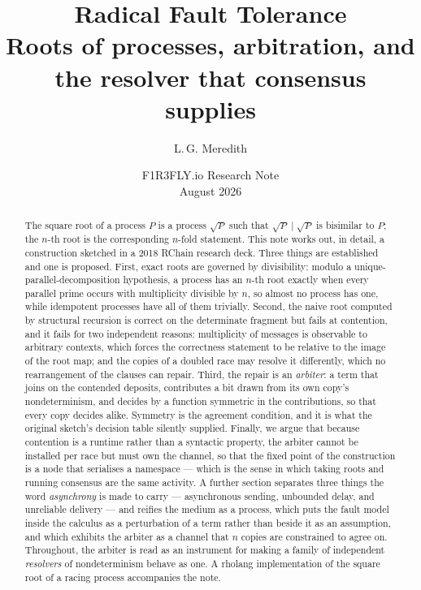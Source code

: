 \documentclass[11pt]{article}
\title{Radical Fault Tolerance\\[0.4em]
\large Roots of processes, arbitration, and the resolver that consensus supplies}
\author{L.\,G. Meredith}
\date{F1R3FLY.io Research Note\\ August 2026}
\theoremstyle{definition}
\newcommand{\rt}[1]{\sqrt{#1}}
\begin{document}
\maketitle

\begin{abstract}
The square root of a process $P$ is a process $\rt{P}$ such that $\rt{P} \mid \rt{P}$ is bisimilar to $P$; the $n$-th root is the corresponding $n$-fold statement. This note works out, in detail, a construction sketched in a 2018 RChain research deck. Three things are established and one is proposed. First, exact roots are governed by divisibility: modulo a unique-parallel-decomposition hypothesis, a process has an $n$-th root exactly when every parallel prime occurs with multiplicity divisible by $n$, so almost no process has one, while idempotent processes have all of them trivially. Second, the naive root computed by structural recursion is correct on the determinate fragment but fails at contention, and it fails for two independent reasons: multiplicity of messages is observable to arbitrary contexts, which forces the correctness statement to be relative to the image of the root map; and the copies of a doubled race may resolve it differently, which no rearrangement of the clauses can repair. Third, the repair is an \emph{arbiter}: a term that joins on the contended deposits, contributes a bit drawn from its own copy's nondeterminism, and decides by a function symmetric in the contributions, so that every copy decides alike. Symmetry is the agreement condition, and it is what the original sketch's decision table silently supplied. Finally, we argue that because contention is a runtime rather than a syntactic property, the arbiter cannot be installed per race but must own the channel, so that the fixed point of the construction is a node that serialises a namespace --- which is the sense in which taking roots and running consensus are the same activity. A further section separates three things the word \emph{asynchrony} is made to carry --- asynchronous sending, unbounded delay, and unreliable delivery --- and reifies the medium as a process, which puts the fault model inside the calculus as a perturbation of a term rather than beside it as an assumption, and which exhibits the arbiter as a channel that $n$ copies are constrained to agree on. Throughout, the arbiter is read as an instrument for making a family of independent \emph{resolvers} of nondeterminism behave as one. A rholang implementation of the square root of a racing process accompanies the note.
\end{abstract}
\end{document}

